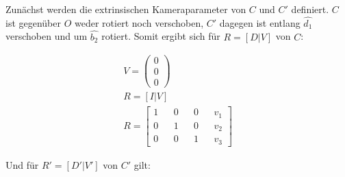 %

Zunächst werden die extrinsischen Kameraparameter von $C$ und $C'$ definiert. $C$ ist gegenüber $O$ weder rotiert noch verschoben, $C'$ dagegen ist entlang $\hat{d_1}$ verschoben und um $\hat{b_2}$ rotiert. Somit ergibt sich für $R=[D|V]$ von $C$:



\begin{gather}
	V=\begin{pmatrix}
		0\\0\\0
	\end{pmatrix}\\
	R = [I|V]\\
	R = \begin{bmatrix}
		1&&0&&0&&v_1\\
		0&&1&&0&&v_2\\
		0&&0&&1&&v_3
	\end{bmatrix}
\end{gather} 



Und für $R'=[D'|V']$ von $C'$ gilt:

